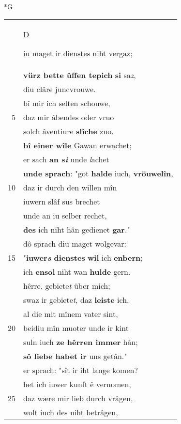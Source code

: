 \documentclass[8pt,a4paper,notitlepage]{article}
\begin{document}
\begin{table}[ht]
\begin{minipage}[t]{0.5\linewidth}
\small
\begin{center}*G
\end{center}
\begin{tabular}{rl}
 & \begin{large}D\end{large}iu maget ir dienstes niht vergaz;\\ 
 & \textbf{vürz bette ûffen tepich} \textbf{si} sa\textit{z},\\ 
 & diu clâre juncvrouwe.\\ 
 & bî mir ich selten schouwe,\\ 
5 & daz mir âbendes oder vruo\\ 
 & solch âventiure \textbf{slîche} zuo.\\ 
 & \textbf{bî einer wîle} Gawan erwachet;\\ 
 & er sach \textbf{an s\textit{i}} unde \textit{l}achet\\ 
 & \textbf{unde sprach}: "got \textbf{halde} iuch, \textbf{vröuwelîn},\\ 
10 & daz ir durch den willen mîn\\ 
 & iuwern slâf sus brechet\\ 
 & unde an iu selber rechet,\\ 
 & \textbf{des} ich niht hân gedienet \textbf{gar}."\\ 
 & dô sprach diu maget wolgevar:\\ 
15 & "\textbf{iuwer\textit{s} dienstes} \textbf{wil} ich \textbf{enbern};\\ 
 & ich \textbf{ensol} niht wan \textbf{hulde} gern.\\ 
 & hêrre, gebiete\textit{t} über mich;\\ 
 & swaz ir gebiete\textit{t}, daz \textbf{leiste} ich.\\ 
 & al die mit mînem vater sint,\\ 
20 & beidiu mîn muoter unde ir kint\\ 
 & suln iuch \textbf{ze hêrren immer} hân;\\ 
 & \textbf{sô liebe habet ir} uns getân."\\ 
 & er sprach: "sît ir iht lange komen?\\ 
 & het ich iuwer kunft ê vernomen,\\ 
25 & daz wære mir lieb durch vrâgen,\\ 
 & wolt iuch des niht betrâgen,\\ 

\end{tabular}
\end{minipage}
\end{table}
\end{document}
